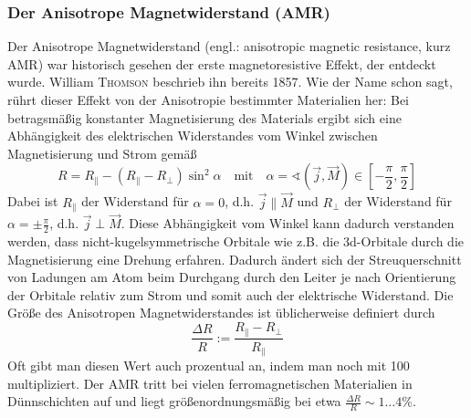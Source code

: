 \documentclass[german,  %
parskip=full,  %
]{scrartcl}
\begin{document}
\subsubsection{Der Anisotrope Magnetwiderstand (AMR)}
Der Anisotrope Magnetwiderstand (engl.: anisotropic magnetic resistance, kurz AMR) war historisch gesehen der erste magnetoresistive Effekt, der entdeckt wurde. William \textsc{Thomson} beschrieb ihn bereits 1857. Wie der Name schon sagt, rührt dieser Effekt von der Anisotropie bestimmter Materialien her: Bei betragsmäßig konstanter Magnetisierung des Materials ergibt sich eine Abhängigkeit des elektrischen Widerstandes vom Winkel zwischen Magnetisierung und Strom gemäß
\[R = R_{\parallel} - (R_{\parallel} - R_{\perp})\sin^2\alpha\quad\text{mit}\quad \alpha = \sphericalangle (\vec{j},\vec{M})\in\left[-\frac{\pi}{2},\frac{\pi}{2}\right]\]
Dabei ist \(R_{\parallel}\) der Widerstand für \(\alpha=0\), d.h. \(\vec{j}\parallel\vec{M}\) und \(R_{\perp}\) der Widerstand für \(\alpha=\pm\frac{\pi}{2}\), d.h. \(\vec{j}\perp\vec{M}\).
Diese Abhängigkeit vom Winkel kann dadurch verstanden werden, dass nicht-kugelsymmetrische Orbitale wie z.B. die 3d-Orbitale durch die Magnetisierung eine Drehung erfahren. Dadurch ändert sich der Streuquerschnitt von Ladungen am Atom beim Durchgang durch den Leiter je nach Orientierung der Orbitale relativ zum Strom und somit auch der elektrische Widerstand. Die Größe des Anisotropen Magnetwiderstandes ist üblicherweise definiert durch
\[\frac{\Delta R}{R} := \frac{R_{\parallel} - R_{\perp}}{R_{\parallel}}\]
Oft gibt man diesen Wert auch prozentual an, indem man noch mit 100 multipliziert. Der AMR tritt bei vielen ferromagnetischen Materialien in Dünnschichten auf und liegt größenordnungsmäßig bei etwa \(\frac{\Delta R}{R} \sim 1\hdots 4\%\).
\end{document}
